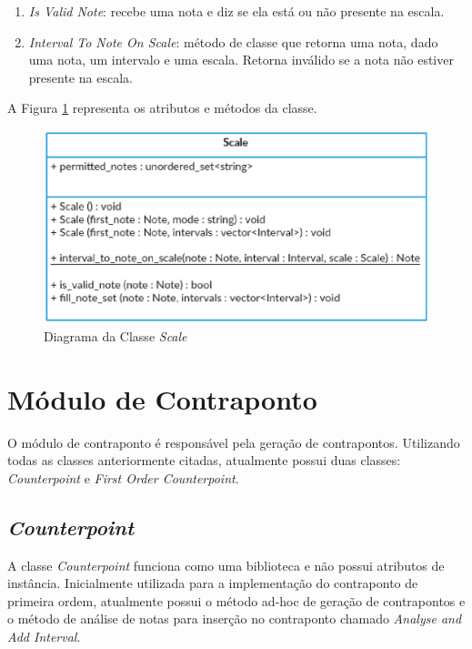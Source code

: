     \begin{enumerate}
      \item \textit{Is Valid Note}: recebe uma nota e diz se ela está ou não presente na escala.
      \item \textit{Interval To Note On Scale}: método de classe que retorna uma nota, dado uma nota, um intervalo e uma escala. Retorna inválido se a nota não estiver presente na escala.
    \end{enumerate}


    A Figura \ref{scaleclass} representa os atributos e métodos da classe.

    \begin{figure}[htb]
      \centering
      \includegraphics[scale=0.7]{figuras/scaleclass.eps}
      \caption{Diagrama da Classe \textit{Scale}}
      \label{scaleclass}
    \end{figure}

  \section[Módulo de Contraponto]{Módulo de Contraponto}

    O módulo de contraponto é responsável pela geração de contrapontos. Utilizando todas as classes anteriormente citadas, atualmente possui duas classes: \textit{Counterpoint} e  \textit{First Order Counterpoint}.

    \subsection[\textit{Counterpoint}]{\textit{Counterpoint}}

    A classe \textit{Counterpoint} funciona como uma biblioteca e não possui atributos de instância. Inicialmente utilizada para a implementação do contraponto de primeira ordem, atualmente possui o método ad-hoc de geração de contrapontos e o método de análise de notas para inserção no contraponto chamado \textit{Analyse and Add Interval}.

